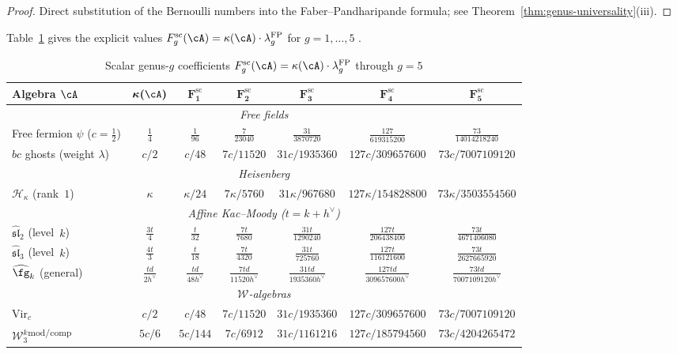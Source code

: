 \begin{proof}
Direct substitution of the Bernoulli numbers into the
Faber--Pandharipande formula; see
Theorem~\ref{thm:genus-universality}(iii).
\end{proof}

Table~\ref{tab:genus-obstructions} gives the explicit values
$F_g^{\mathrm{sc}}(\cA)=\kappa(\cA) \cdot \lambda_g^{\mathrm{FP}}$ for
$g = 1, \ldots, 5$ .

\begin{table}[ht]
\centering
\caption{Scalar genus-$g$ coefficients $F_g^{\mathrm{sc}}(\cA)=\kappa(\cA) \cdot \lambda_g^{\mathrm{FP}}$ through $g = 5$ }
\label{tab:genus-obstructions}
\renewcommand{\arraystretch}{1.5}
{\footnotesize
\begin{tabular}{|l|c|c|c|c|c|c|}
\hline
\textbf{Algebra $\cA$}
 & $\boldsymbol{\kappa(\cA)}$
 & $\boldsymbol{F^{\mathrm{sc}}_1}$
 & $\boldsymbol{F^{\mathrm{sc}}_2}$
 & $\boldsymbol{F^{\mathrm{sc}}_3}$
 & $\boldsymbol{F^{\mathrm{sc}}_4}$
 & $\boldsymbol{F^{\mathrm{sc}}_5}$ \\
\hline
\multicolumn{7}{|c|}{\textit{Free fields}} \\
\hline
Free fermion $\psi$ ($c = \tfrac{1}{2}$)
 & $\tfrac{1}{4}$
 & $\tfrac{1}{96}$
 & $\tfrac{7}{23040}$
 & $\tfrac{31}{3870720}$
 & $\tfrac{127}{619315200}$
 & $\tfrac{73}{14014218240}$ \\
\hline
$bc$ ghosts (weight $\lambda$)
 & $c/2$
 & $c/48$
 & $7c/11520$
 & $31c/1935360$
 & $127c/309657600$
 & $73c/7007109120$ \\
\hline
\multicolumn{7}{|c|}{\textit{Heisenberg}} \\
\hline
$\mathcal{H}_\kappa$ (rank~$1$)
 & $\kappa$
 & $\kappa/24$
 & $7\kappa/5760$
 & $31\kappa/967680$
 & $127\kappa/154828800$
 & $73\kappa/3503554560$ \\
\hline
\multicolumn{7}{|c|}{\textit{Affine Kac--Moody ($t = k + h^\vee$)}} \\
\hline
$\widehat{\mathfrak{sl}}_2$ (level~$k$)
 & $\frac{3t}{4}$
 & $\frac{t}{32}$
 & $\frac{7t}{7680}$
 & $\frac{31t}{1290240}$
 & $\frac{127t}{206438400}$
 & $\frac{73t}{4671406080}$ \\[4pt]
\hline
$\widehat{\mathfrak{sl}}_3$ (level~$k$)
 & $\frac{4t}{3}$
 & $\frac{t}{18}$
 & $\frac{7t}{4320}$
 & $\frac{31t}{725760}$
 & $\frac{127t}{116121600}$
 & $\frac{73t}{2627665920}$ \\[4pt]
\hline
$\widehat{\fg}_k$ (general)
 & $\frac{td}{2h^\vee}$
 & $\frac{td}{48 h^\vee}$
 & $\frac{7td}{11520 h^\vee}$
 & $\frac{31td}{1935360 h^\vee}$
 & $\frac{127td}{309657600 h^\vee}$
 & $\frac{73td}{7007109120 h^\vee}$ \\[4pt]
\hline
\multicolumn{7}{|c|}{\textit{$\mathcal{W}$-algebras}} \\
\hline
$\mathrm{Vir}_c$
 & $c/2$
 & $c/48$
 & $7c/11520$
 & $31c/1935360$
 & $127c/309657600$
 & $73c/7007109120$ \\[4pt]
\hline
$\mathcal{W}_3^k$\textsuperscript{$\mathrm{mod/comp}$}
 & $5c/6$
 & $5c/144$
 & $7c/6912$
 & $31c/1161216$
 & $127c/185794560$
 & $73c/4204265472$ \\[4pt]
\hline
\end{tabular}
}
\end{table}

